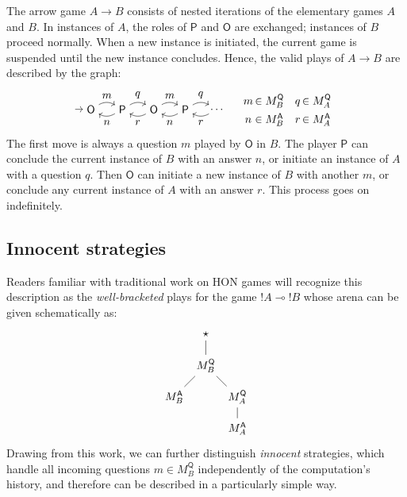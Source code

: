 \documentclass[format=sigplan,authordraft]{acmart}
\newcommand{\kw}[1]{\ensuremath{\mathsf{#1}}}
\begin{document}
The arrow game $A \rightarrow B$ consists of
nested iterations of the elementary games $A$ and $B$.
In instances of $A$, the roles of $\kw{P}$ and $\kw{O}$ are exchanged;
instances of $B$ proceed normally.
When a new instance is initiated,
the current game is suspended
until the new instance concludes.
Hence,
the valid plays of $A \rightarrow B$
are described by the graph:
\[
  \begin{tikzpicture}[baseline=(O1.base)]
    \node (O1) at (0,0) {\kw{O}};
    \node (P1) at (1,0) {\kw{P}};
    \node (O2) at (2,0) {\kw{O}};
    \node (P2) at (3,0) {\kw{P}};
    \node (O3) at (4,0) {$\ldots$};
    \path [->] (-0.5,0) edge (O1);
    \path [->] (O1) edge[bend left] node[auto] {$m$} (P1);
    \path [->] (P1) edge[bend left] node[auto] {$n$} (O1);
    \path [->] (P1) edge[bend left] node[auto] {$q$} (O2);
    \path [->] (O2) edge[bend left] node[auto] {$r$} (P1);
    \path [->] (O2) edge[bend left] node[auto] {$m$} (P2);
    \path [->] (P2) edge[bend left] node[auto] {$n$} (O2);
    \path [->] (P2) edge[bend left] node[auto] {$q$} (O3);
    \path [->] (O3) edge[bend left] node[auto] {$r$} (P2);
  \end{tikzpicture}
  \quad
  \begin{array}{c@{\,}l@{\quad}c@{\,}l}
    m &\in M_B^\kw{Q} & q &\in M_A^\kw{Q} \\[1ex]
    n &\in M_B^\kw{A} & r &\in M_A^\kw{A}
  \end{array}
\]
The first move is always a question $m$ played by $\kw{O}$ in $B$.
The player $\kw{P}$ can conclude the current instance of $B$
with an answer $n$, or
initiate an instance of $A$
with a question $q$.
Then $\kw{O}$ can initiate a new instance of $B$
with another $m$, or
conclude any current instance of $A$
with an answer $r$.
This process goes on indefinitely.


\subsection{Innocent strategies} %

Readers familiar with traditional work on HON games \cite{something}
will recognize this description
as the \emph{well-bracketed} plays for the game ${!}A \multimap {!}B$
whose arena can be given schematically as:
\[
  \begin{tikzpicture}
    \node (S) at (0,3) {$\star$};
    \node (BQ) at (0,2) {$M_B^\kw{Q}$};
    \node (BA) at (-1,1) {$M_B^\kw{A}$};
    \node (AQ) at (+1,1) {$M_A^\kw{Q}$};
    \node (AA) at (+1,0) {$M_A^\kw{A}$};
    \path (S) edge (BQ);
    \path (BQ) edge (BA);
    \path (BQ) edge (AQ);
    \path (AQ) edge (AA);
  \end{tikzpicture}
\]
Drawing from this work,
we can further distinguish \emph{innocent} strategies,
which handle all incoming questions $m \in M_B^\kw{Q}$
independently of the computation's history,
and therefore can be described in a particularly simple way.
\end{document}
